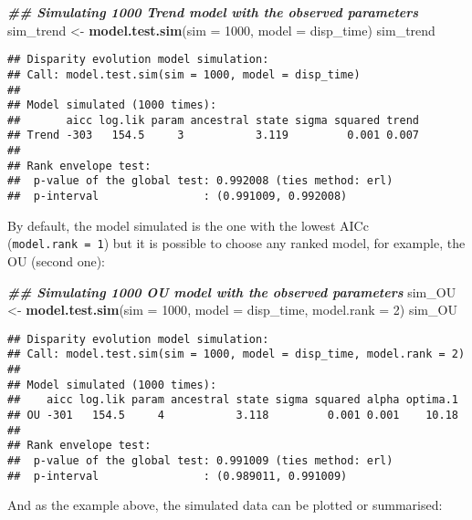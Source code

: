 \documentclass[
]{book}
\newenvironment{Shaded}{\begin{snugshade}}{\end{snugshade}}
\newcommand{\AttributeTok}[1]{\textcolor[rgb]{0.13,0.29,0.53}{#1}}
\newcommand{\DecValTok}[1]{\textcolor[rgb]{0.00,0.00,0.81}{#1}}
\newcommand{\DocumentationTok}[1]{\textcolor[rgb]{0.56,0.35,0.01}{\textbf{\textit{#1}}}}
\newcommand{\FunctionTok}[1]{\textcolor[rgb]{0.13,0.29,0.53}{\textbf{#1}}}
\newcommand{\NormalTok}[1]{#1}
\newcommand{\OtherTok}[1]{\textcolor[rgb]{0.56,0.35,0.01}{#1}}
\begin{document}
\begin{Shaded}
\begin{Highlighting}[]
\DocumentationTok{\#\# Simulating 1000 Trend model with the observed parameters}
\NormalTok{sim\_trend }\OtherTok{\textless{}{-}} \FunctionTok{model.test.sim}\NormalTok{(}\AttributeTok{sim =} \DecValTok{1000}\NormalTok{, }\AttributeTok{model =}\NormalTok{ disp\_time)}
\NormalTok{sim\_trend}
\end{Highlighting}
\end{Shaded}

\begin{verbatim}
## Disparity evolution model simulation:
## Call: model.test.sim(sim = 1000, model = disp_time) 
## 
## Model simulated (1000 times):
##       aicc log.lik param ancestral state sigma squared trend
## Trend -303   154.5     3           3.119         0.001 0.007
## 
## Rank envelope test:
##  p-value of the global test: 0.992008 (ties method: erl)
##  p-interval                : (0.991009, 0.992008)
\end{verbatim}

By default, the model simulated is the one with the lowest AICc (\texttt{model.rank\ =\ 1}) but it is possible to choose any ranked model, for example, the OU (second one):

\begin{Shaded}
\begin{Highlighting}[]
\DocumentationTok{\#\# Simulating 1000 OU model with the observed parameters}
\NormalTok{sim\_OU }\OtherTok{\textless{}{-}} \FunctionTok{model.test.sim}\NormalTok{(}\AttributeTok{sim =} \DecValTok{1000}\NormalTok{, }\AttributeTok{model =}\NormalTok{ disp\_time,}
                         \AttributeTok{model.rank =} \DecValTok{2}\NormalTok{)}
\NormalTok{sim\_OU}
\end{Highlighting}
\end{Shaded}

\begin{verbatim}
## Disparity evolution model simulation:
## Call: model.test.sim(sim = 1000, model = disp_time, model.rank = 2) 
## 
## Model simulated (1000 times):
##    aicc log.lik param ancestral state sigma squared alpha optima.1
## OU -301   154.5     4           3.118         0.001 0.001    10.18
## 
## Rank envelope test:
##  p-value of the global test: 0.991009 (ties method: erl)
##  p-interval                : (0.989011, 0.991009)
\end{verbatim}

And as the example above, the simulated data can be plotted or summarised:
\end{document}
